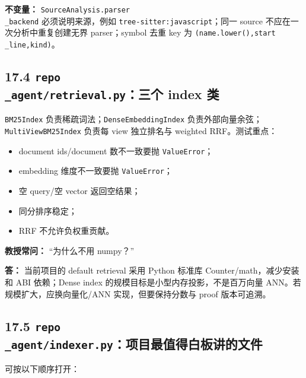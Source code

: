 \documentclass[UTF8,12pt,openany]{ctexbook}
\begin{document}
\textbf{不变量：} \texttt{SourceAnalysis.parser\\_backend} 必须说明来源，例如 \texttt{tree-sitter:javascript}；同一 source 不应在一次分析中重复创建无界 parser；symbol 去重 key 为 \texttt{(name.lower(),start\\_line,kind)}。\par

\subsection{17.4 \texttt{repo\\_agent/retrieval.py}：三个 index 类}

\texttt{BM25Index} 负责稀疏词法；\texttt{DenseEmbeddingIndex} 负责外部向量余弦；\texttt{MultiViewBM25Index} 负责每 view 独立排名与 weighted RRF。测试重点：\par

\begin{itemize}
\item document ids/document 数不一致要抛 \texttt{ValueError}；
\item embedding 维度不一致要抛 \texttt{ValueError}；
\item 空 query/空 vector 返回空结果；
\item 同分排序稳定；
\item RRF 不允许负权重贡献。
\end{itemize}

\textbf{教授常问：} “为什么不用 numpy？”\par

\textbf{答：} 当前项目的 default retrieval 采用 Python 标准库 Counter/math，减少安装和 ABI 依赖；Dense index 的规模目标是小型内存投影，不是百万向量 ANN。若规模扩大，应换向量化/ANN 实现，但要保持分数与 proof 版本可追溯。\par

\subsection{17.5 \texttt{repo\\_agent/indexer.py}：项目最值得白板讲的文件}

可按以下顺序打开：\par
\end{document}
